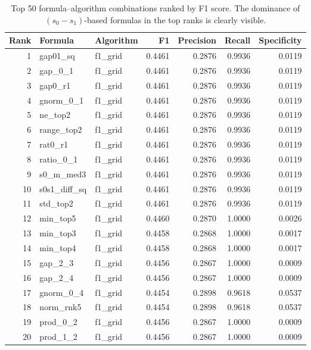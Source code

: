 \documentclass[11pt,a4paper]{article}
\begin{document}
\begin{table}[htbp]
\centering
\caption{Top 50 formula--algorithm combinations ranked by F1 score. The dominance of $(s_0 - s_1)$-based formulas in the top ranks is clearly visible.}
\label{tab:top50}
\scriptsize
\begin{tabular}{@{}rllrrrr@{}}
\toprule
\textbf{Rank} & \textbf{Formula} & \textbf{Algorithm} & \textbf{F1} & \textbf{Precision} & \textbf{Recall} & \textbf{Specificity} \\
\midrule
 1 & gap01\_sq & f1\_grid & 0.4461 & 0.2876 & 0.9936 & 0.0119 \\
 2 & gap\_0\_1 & f1\_grid & 0.4461 & 0.2876 & 0.9936 & 0.0119 \\
 3 & gap0\_r1 & f1\_grid & 0.4461 & 0.2876 & 0.9936 & 0.0119 \\
 4 & gnorm\_0\_1 & f1\_grid & 0.4461 & 0.2876 & 0.9936 & 0.0119 \\
 5 & ne\_top2 & f1\_grid & 0.4461 & 0.2876 & 0.9936 & 0.0119 \\
 6 & range\_top2 & f1\_grid & 0.4461 & 0.2876 & 0.9936 & 0.0119 \\
 7 & rat0\_r1 & f1\_grid & 0.4461 & 0.2876 & 0.9936 & 0.0119 \\
 8 & ratio\_0\_1 & f1\_grid & 0.4461 & 0.2876 & 0.9936 & 0.0119 \\
 9 & s0\_m\_med3 & f1\_grid & 0.4461 & 0.2876 & 0.9936 & 0.0119 \\
10 & s0s1\_diff\_sq & f1\_grid & 0.4461 & 0.2876 & 0.9936 & 0.0119 \\
11 & std\_top2 & f1\_grid & 0.4461 & 0.2876 & 0.9936 & 0.0119 \\
12 & min\_top5 & f1\_grid & 0.4460 & 0.2870 & 1.0000 & 0.0026 \\
13 & min\_top3 & f1\_grid & 0.4458 & 0.2868 & 1.0000 & 0.0017 \\
14 & min\_top4 & f1\_grid & 0.4458 & 0.2868 & 1.0000 & 0.0017 \\
15 & gap\_2\_3 & f1\_grid & 0.4456 & 0.2867 & 1.0000 & 0.0009 \\
16 & gap\_2\_4 & f1\_grid & 0.4456 & 0.2867 & 1.0000 & 0.0009 \\
17 & gnorm\_0\_4 & f1\_grid & 0.4454 & 0.2898 & 0.9618 & 0.0537 \\
18 & norm\_rnk5 & f1\_grid & 0.4454 & 0.2898 & 0.9618 & 0.0537 \\
19 & prod\_0\_2 & f1\_grid & 0.4456 & 0.2867 & 1.0000 & 0.0009 \\
20 & prod\_1\_2 & f1\_grid & 0.4456 & 0.2867 & 1.0000 & 0.0009 \\

\end{tabular}
\end{table}
\end{document}
